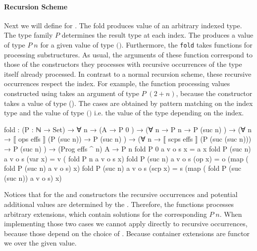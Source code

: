 \paragraph{Recursion Scheme} Next we will define  for
\AgdaSpace{}\AgdaSpace{}.
The fold produces value of an arbitrary  indexed type.
The type family $P$ determines the result type at each index.
The  produces a value of type $P\;n$ for a given value of
type
$($\AgdaSpace{}\AgdaSpace{}\AgdaFunction{\textasciicircum}\AgdaSpace{}$)$\AgdaSpace{}.
Furthermore, the \texttt{fold} takes functions for processing substructures.
As usual, the arguments of these function correspond to those of the
constructors they processes with recursive occurrences of the type itself already
processed.
In contrast to a normal recursion scheme, these recursive occurrences respect
the index.
For example, the function processing values constructed using
 takes an argument of type $P\;(2 + n)$, because
the constructor takes a value of type 
\AgdaSpace{}\AgdaSpace{}(\AgdaSpace{}\AgdaSpace{}).
The cases are obtained by pattern matching on the index type and the value of
type
$($\AgdaSpace{}\AgdaSpace{}\AgdaFunction{\textasciicircum}\AgdaSpace{}$)$\AgdaSpace{}
i.e. the value of the type depending on the index.

\begin{code}
fold : (P : ℕ → Set) → ∀ n →
  (A                                           → P 0        )  →
  (∀ {n} → P n                                 → P (suc n)  )  →
  (∀ {n} → ⟦ ops   effs  ⟧  (P (suc n))        → P (suc n)  )  →
  (∀ {n} → ⟦ scps  effs  ⟧  (P (suc (suc n)))  → P (suc n)  )  →
  (Prog effs ^ n) A → P n
fold P 0        a v o s x         = a  x
fold P (suc n)  a v o s (var  x)  = v  (       fold P n              a v o s   x)
fold P (suc n)  a v o s (op   x)  = o  (map (  fold P (suc n)        a v o s)  x)
fold P (suc n)  a v o s (scp  x)  = s  (map (  fold P (suc (suc n))  a v o s)  x)
\end{code}
Notices that for the  and
 constructors the recursive occurrences and
potential additional values are determined by the .
Therefore, the functions processes arbitrary  extensions,
which contain solutions for the corresponding $P\;n$.
When implementing those two cases we cannot apply  directly
to recursive occurrences, because those depend on the choice of
.
Because container extensions are functor we  over the given
value.

